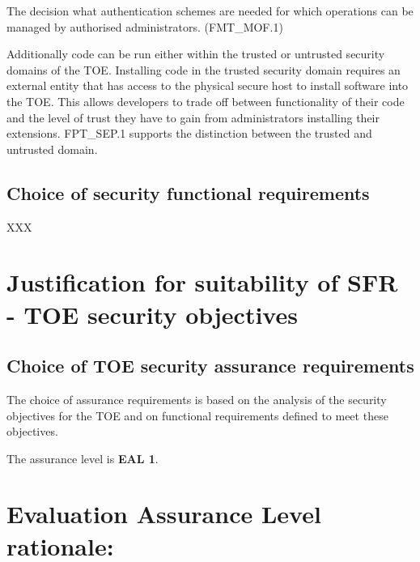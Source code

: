 \documentclass[12pt,english]{scrbook}
\begin{document}
    The decision what authentication schemes are needed for which operations
    can be managed by authorised administrators. (FMT\_MOF.1)

    Additionally code can be run either within the trusted or untrusted
    security domains of the TOE. Installing code in the trusted security domain
    requires an external entity that has access to the physical secure host to
    install software into the TOE. This allows developers to trade off between
    functionality of their code and the level of trust they have to gain from
    administrators installing their extensions. FPT\_SEP.1 supports the
    distinction between the trusted and untrusted domain.




\subsection{Choice of security functional requirements}

XXX





\section{Justification for suitability of SFR - TOE security objectives}





\subsection{Choice of TOE security assurance requirements}

The choice of assurance requirements is based on the analysis of the security
objectives for the TOE and on functional requirements defined to meet these
objectives.

The assurance level is \textbf{EAL 1}.





\section{Evaluation Assurance Level rationale:}
\end{document}
